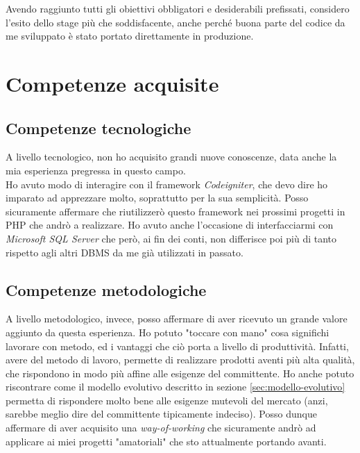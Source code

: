 Avendo raggiunto tutti gli obiettivi obbligatori e desiderabili prefissati, considero l'esito dello stage più che soddisfacente, anche perché buona parte del codice da me sviluppato è stato portato direttamente in produzione.
\section{Competenze acquisite}
\subsection{Competenze tecnologiche}
A livello tecnologico, non ho acquisito grandi nuove conoscenze, data anche la mia esperienza pregressa in questo campo.\\ Ho avuto modo di interagire con il \gls{framework} \textit{Codeigniter}, che devo dire ho imparato ad apprezzare molto, soprattutto per la sua semplicità. Posso sicuramente affermare che riutilizzerò questo \gls{framework} nei prossimi progetti in PHP che andrò a realizzare. Ho avuto anche l'occasione di interfacciarmi con \textit{Microsoft SQL Server} che però, ai fin dei conti, non differisce poi più di tanto rispetto agli altri \gls{DBMS} da me già utilizzati in passato.
\subsection{Competenze metodologiche}
A livello metodologico, invece, posso affermare di aver ricevuto un grande valore aggiunto da questa esperienza. Ho potuto "toccare con mano" cosa significhi lavorare con metodo, ed i vantaggi che ciò porta a livello di produttività. Infatti, avere del metodo di lavoro, permette di realizzare prodotti aventi più alta qualità, che rispondono in modo più affine alle esigenze del committente. Ho anche potuto riscontrare come il modello evolutivo descritto in sezione \ref{sec:modello-evolutivo} permetta di rispondere molto bene alle esigenze mutevoli del mercato (anzi, sarebbe meglio dire del committente tipicamente indeciso). Posso dunque affermare di aver acquisito una \textit{way-of-working} che sicuramente andrò ad applicare ai miei progetti "amatoriali" che sto attualmente portando avanti.
